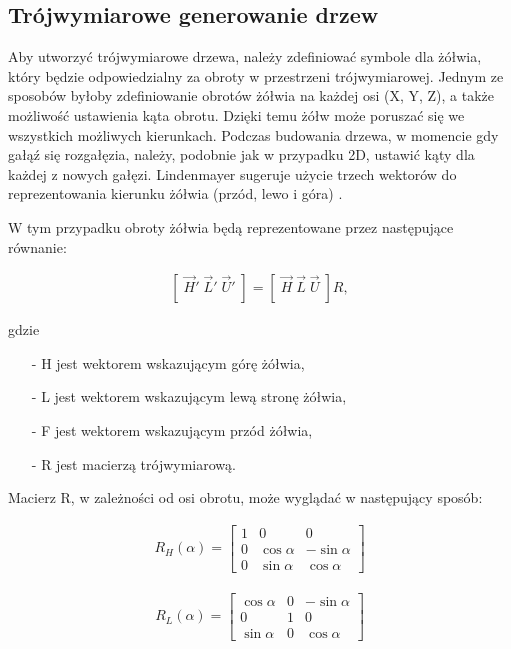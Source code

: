 \documentclass[a4paper,twoside,12pt]{report}
\begin{document}
\subsection{Trójwymiarowe generowanie drzew}

Aby utworzyć trójwymiarowe drzewa, należy zdefiniować symbole dla żółwia, 
który będzie odpowiedzialny za obroty w przestrzeni trójwymiarowej. 
Jednym ze sposobów byłoby zdefiniowanie obrotów żółwia na każdej osi (X, Y, Z), 
a także możliwość ustawienia kąta obrotu. Dzięki temu żółw może poruszać się we 
wszystkich możliwych kierunkach. Podczas budowania drzewa, w momencie gdy gałąź 
się rozgałęzia, należy, podobnie jak w przypadku 2D, ustawić kąty dla każdej z 
nowych gałęzi. Lindenmayer sugeruje użycie trzech wektorów 
do reprezentowania kierunku żółwia (przód, lewo i góra) \cite{beautyofplants}.

W tym przypadku obroty żółwia będą reprezentowane przez 
następujące równanie:

\begin{gather}
	\left[ \; \overrightarrow{H}' \; \overrightarrow{L}' \; \overrightarrow{U}' \; \right] 
	= \left[ \; \overrightarrow{H} \; \overrightarrow{L} \;  \overrightarrow{U} \; \right] R,
\end{gather}

gdzie 
\begin{itemize}
	\item[-] H jest wektorem wskazującym górę żółwia, 
	\item[-] L jest wektorem wskazującym lewą stronę żółwia, 
	\item[-] F jest wektorem wskazującym przód żółwia,
	\item[-] R jest macierzą trójwymiarową.
\end{itemize}
 Macierz R, w zależności od osi obrotu, 
może wyglądać w następujący sposób:

\begin{gather}
	R_{H}(\alpha) =  
	\begin{bmatrix}
		1 & 0 & 0 \\
		0 & \cos{\alpha} & -\sin{\alpha}   \\
		0 & \sin{\alpha} & \cos{\alpha}  
	\end{bmatrix}
\end{gather}

\begin{gather}
	R_{L}(\alpha) =  
	\begin{bmatrix}
		\cos{\alpha} & 0 & -\sin{\alpha}   \\
		0 & 1 & 0 \\
		\sin{\alpha} & 0 &  \cos{\alpha}
	\end{bmatrix}
\end{gather}
\end{document}
